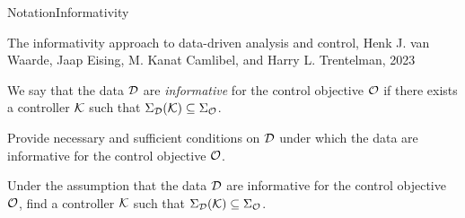 \documentclass[aspectratio=169, handout, 10pt, hyperref=colorlinks]{beamer}
\begin{document}
\begin{frame}[allowframebreaks]{Notation}{Informativity}
\begin{figure}[H]
        \label{fig:notinformativedata}
    \end{figure}
    \begin{center}
    \tiny{The informativity approach to data-driven analysis and control, Henk J. van Waarde, Jaap Eising, M. Kanat Camlibel, and Harry L. Trentelman, 2023}
    \end{center}
    \begin{definition}\label{ch1:def:par informativity}
    We say that the data $\mathcal{D}$ are \textit{informative} for the control objective $\mathcal{O}$ if there exists a controller $\mathcal{K}$ such that $\Sigma_{\mathcal{D}}(\mathcal{K}) \subseteq \Sigma_{\mathcal{O}}$. 
    \end{definition}
    \begin{problem}\label{ch1:prob:parametrized}
    Provide necessary and sufficient conditions on $\mathcal{D}$ under which the data are informative for the control objective $\mathcal{O}$.
    \end{problem}
    \begin{problem}\label{ch1:prob:design}
    Under the assumption that the data $\mathcal{D}$ are informative for the control objective $\mathcal{O}$, find a controller $\mathcal{K}$ such that $\Sigma_{\mathcal{D}} (\mathcal{K}) \subseteq \Sigma_{\mathcal{O}}$. 
    \end{problem}

\end{frame}
\end{document}
